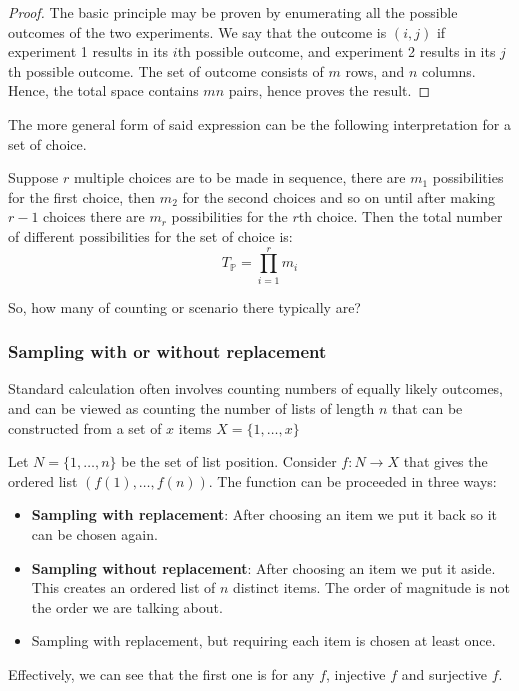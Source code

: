 \begin{proof}
    The basic principle may be proven by enumerating all the possible outcomes of the two experiments. We say that the outcome is $(i,j)$ if experiment 1 results in its $i$th possible outcome, and experiment 2 results in its $j$th possible outcome. The set of outcome consists of $m$ rows, and $n$ columns. Hence, the total space contains $mn$ pairs, hence proves the result.
\end{proof}

The more general form of said expression can be the following interpretation for a set of choice. 
\begin{definition}
    Suppose $r$ multiple choices are to be made in sequence, there are $m_{1}$ possibilities for the first choice, then $m_{2}$ for the second choices and so on until after making $r-1$ choices there are $m_{r}$ possibilities for the $r$th choice. Then the total number of different possibilities for the set of choice is: $$T_{\mathbb{P}}= \prod_{i=1}^{r}m_{i}$$
\end{definition}
So, how many of counting or scenario there typically are? 
\subsubsection{Sampling with or without replacement}
Standard calculation often involves counting numbers of equally likely outcomes, and can be viewed as counting the number of lists of length $n$ that can be constructed from a set of $x$ items $X= \{ 1,\dots,x \}$

Let $N=\{ 1,\dots,n \}$ be the set of list position. Consider $f:N\to X$ that gives the ordered list $(f(1),\dots,f(n))$. The function can be proceeded in three ways: 
\begin{itemize}[noitemsep,topsep=0pt]
    \item \textbf{Sampling with replacement}: After choosing an item we put it back so it can be chosen again.
    \item \textbf{Sampling without replacement}: After choosing an item we put it aside. This creates an ordered list of $n$ distinct items. The order of magnitude is not the order we are talking about.  
    \item Sampling with replacement, but requiring each item is chosen at least once. 
\end{itemize}

Effectively, we can see that the first one is for any $f$, injective $f$ and surjective $f$. 
